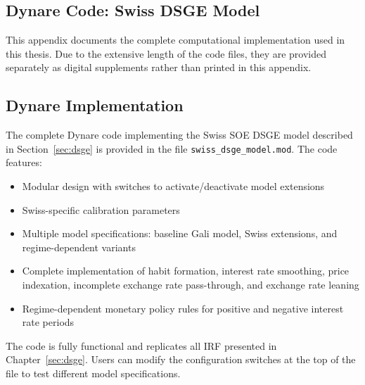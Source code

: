 \documentclass[12pt,a4paper]{article}
\begin{document}
\newpage

\begin{appendices}
\renewcommand{\thesection}{A.\arabic{section}}

\section{Dynare Code: Swiss DSGE Model}
\label{app:dynare_code}

This appendix documents the complete computational implementation used in this thesis. Due to the extensive length of the code files, they are provided separately as digital supplements rather than printed in this appendix.

\subsection{Dynare Implementation}
\label{app:dynare_implementation}

The complete Dynare code implementing the Swiss SOE DSGE model described in Section~\ref{sec:dsge} is provided in the file \texttt{swiss\_dsge\_model.mod}. The code features:

\begin{itemize}
	\item Modular design with switches to activate/deactivate model extensions
	\item Swiss-specific calibration parameters
	\item Multiple model specifications: baseline Gali model, Swiss extensions, and regime-dependent variants
	\item Complete implementation of habit formation, interest rate smoothing, price indexation, incomplete exchange rate pass-through, and exchange rate leaning
	\item Regime-dependent monetary policy rules for positive and negative interest rate periods
\end{itemize}

The code is fully functional and replicates all IRF presented in Chapter~\ref{sec:dsge}. Users can modify the configuration switches at the top of the file to test different model specifications.
\newpage

\end{appendices}
\end{document}
